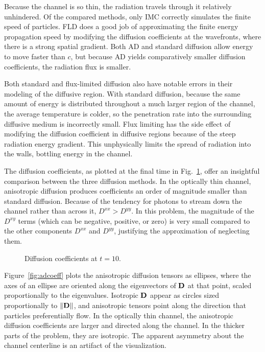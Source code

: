 \documentclass[11pt,letter,twoside]{mc2011}
\begin{document}
Because the channel is so thin, the
radiation travels through it relatively unhindered. Of the compared methods,
only IMC correctly simulates the finite speed of particles. FLD does a good
job of approximating the finite energy propagation speed by modifying the
diffusion coefficients at the wavefronts, where there is a strong spatial
gradient. Both AD and standard diffusion allow energy to move faster than $c$,
but because AD yields comparatively smaller diffusion coefficients, the
radiation flux is smaller.

Both standard and flux-limited diffusion also have notable errors in their
modeling of the diffusive region.
With standard diffusion, because the same amount of energy is distributed
throughout a much larger region of the channel, the average temperature is
colder, so the penetration rate into the surrounding diffusive medium is
incorrectly small.  
Flux limiting has the side effect of modifying the diffusion coefficient
in diffusive regions because of the steep radiation energy gradient. This
unphysically limits the spread of radiation into the walls, bottling energy in
the channel.


The diffusion coefficients, as plotted at the final time in
Fig.~\ref{fig:dcoeffT10}, offer an insightful comparison between the three
diffusion methods. In the optically thin channel, anisotropic
diffusion produces coefficients an order of magnitude smaller than standard
diffusion. Because of the tendency for photons to stream down the channel
rather than across it, $D^{xx} > D^{yy}$.
In this problem, the magnitude of the $D^{xy}$ terms (which can be negative,
positive, or zero) is very small compared to the
other components $D^{xx}$ and $D^{yy}$, justifying the approximation of
neglecting them.  

\begin{figure}[htb]
  \centering
  \hspace{-1.25in}
  \hspace{-1.25in}
  \caption{Diffusion coefficients at $t=10$.}
  \label{fig:dcoeffT10}
\end{figure}

Figure~\ref{fig:adcoeff} plots the anisotropic diffusion tensors as
ellipses, where the axes of an ellipse are oriented along the eigenvectors of
$\mathbf{D}$ at that point, scaled proportionally to the eigenvalues. Isotropic
$\mathbf{D}$ appear as circles sized proportionally to $\left\| \mathbf{D} \right\|$, and
anisotropic tensors point along the direction that particles preferentially
flow. In the optically thin channel, the anisotropic diffusion coefficients are
larger and directed along the channel. In the thicker parts of the problem,
they are isotropic.
The apparent asymmetry about the channel centerline is an artifact of
the visualization.
\end{document}
